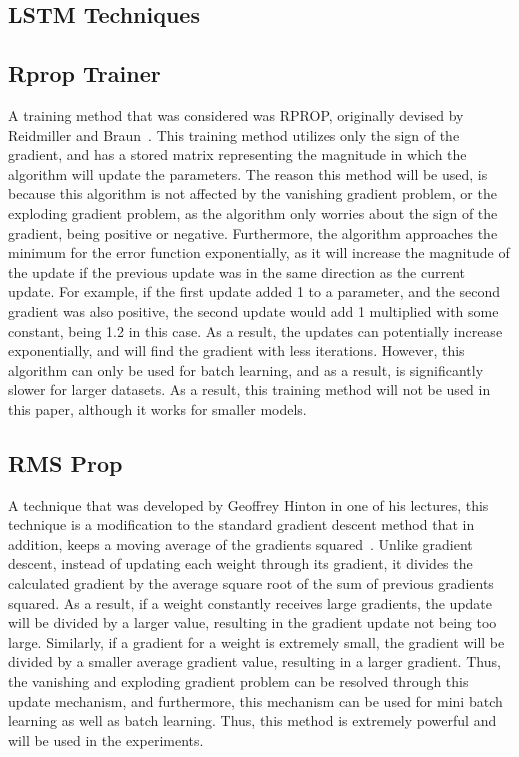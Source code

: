 \documentclass{article}
\begin{document}
\subsection{LSTM Techniques}


\subsection{Rprop Trainer}
A training method that was considered was RPROP, originally devised by
Reidmiller and Braun~\cite{rprop}. This training method utilizes only the sign
of the gradient, and has a stored matrix representing the magnitude in which the
algorithm will update the parameters. The reason this method will be used, is
because this algorithm is not affected by the vanishing gradient problem, or the
exploding gradient problem, as the algorithm only worries about the sign of the
gradient, being positive or negative. Furthermore, the algorithm approaches the
minimum for the error function exponentially, as it will increase the magnitude
of the update if the previous update was in the same direction as the current
update. For example, if the first update added 1 to a parameter, and the second
gradient was also positive, the second update would add 1 multiplied with some
constant, being 1.2 in this case. As a result, the updates can potentially
increase exponentially, and will find the gradient with less iterations.
However, this algorithm can only be used for batch learning, and as a result, is
significantly slower for larger datasets. As a result, this training method will
not be used in this paper, although it works for smaller models.

\subsection{RMS Prop}
A technique that was developed by Geoffrey Hinton in one of his lectures, this
technique is a modification to the standard gradient descent method that in
addition, keeps a moving average of the gradients squared~\cite{rmsprop}. Unlike
gradient descent, instead of updating each weight through its gradient, it
divides the calculated gradient by the average square root of the sum of
previous gradients squared. As a result, if a weight constantly receives large
gradients, the update will be divided by a larger value, resulting in the
gradient update not being too large. Similarly, if a gradient for a weight is
extremely small, the gradient will be divided by a smaller average gradient
value, resulting in a larger gradient. Thus, the vanishing and exploding
gradient problem can be resolved through this update mechanism, and furthermore,
this mechanism can be used for mini batch learning as well as batch learning.
Thus, this method is extremely powerful and will be used in the experiments.
\end{document}
